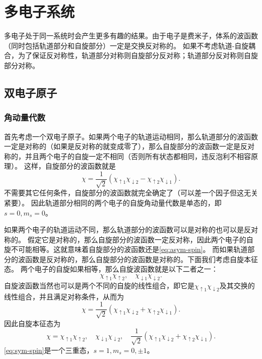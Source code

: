 \documentclass[UTF8, a4paper]{ctexart}
\begin{document}
\section{多电子系统}

多电子处于同一系统时会产生更多有趣的结果。由于电子是费米子，体系的波函数（同时包括轨道部分和自旋部分）一定是交换反对称的。
如果不考虑轨道-自旋耦合，为了保证反对称性，轨道部分对称则自旋部分反对称；轨道部分反对称则自旋部分对称。

\subsection{双电子原子}

\subsubsection{角动量代数}

首先考虑一个双电子原子。如果两个电子的轨道运动相同，那么轨道部分的波函数一定是对称的（如果是反对称的就变成零了），那么自旋部分的波函数一定是反对称的，并且两个电子的自旋一定不相同（否则所有状态都相同，违反泡利不相容原理）。
这样，自旋部分的波函数就是
\begin{equation}
    \chi = \frac{1}{\sqrt{2}} (\chi_{\uparrow 1} \chi_{\downarrow 2} - \chi_{\uparrow 2} \chi_{\downarrow 1}).
    \label{eq:asym-spin}
\end{equation}
不需要其它任何条件，自旋部分的波函数就完全确定了（可以差一个因子但这无关紧要）。
因此轨道部分相同的两个电子的自旋角动量代数是单态的，即$s=0, m_s=0$。

如果两个电子的轨道运动不同，那么轨道部分的波函数可以是对称的也可以是反对称的。
假定它是对称的，那么自旋部分的波函数一定反对称，因此两个电子的自旋不可能相等。这就意味着自旋部分的波函数还是\eqref{eq:asym-spin}。
而如果轨道部分的波函数是反对称的，那么自旋部分的波函数是对称的。下面我们考虑自旋本征态。
两个电子的自旋如果相等，那么自旋波函数就是以下二者之一：
\[
    \chi_{\uparrow 1} \chi_{\uparrow 2}, \quad \chi_{\downarrow 1} \chi_{\downarrow 2}.
\]
自旋波函数当然也可以是两个不同的自旋的线性组合，即它是$\chi_{\uparrow 1} \chi_{\downarrow 2}$及其交换的线性组合，并且满足对称条件，从而为
\[
    \chi = \frac{1}{\sqrt{2}} (\chi_{\uparrow 1} \chi_{\downarrow 2} + \chi_{\uparrow 2} \chi_{\downarrow 1}).
\]
因此自旋本征态为
\begin{equation}
    \chi = \chi_{\uparrow 1} \chi_{\uparrow 2}, \quad \chi_{\downarrow 1} \chi_{\downarrow 2}, \quad \frac{1}{\sqrt{2}} (\chi_{\uparrow 1} \chi_{\downarrow 2} + \chi_{\uparrow 2} \chi_{\downarrow 1}).
    \label{eq:sym-spin}
\end{equation}
\eqref{eq:sym-spin}是一个三重态，$s=1, m_s=0, \pm 1$。
\end{document}
